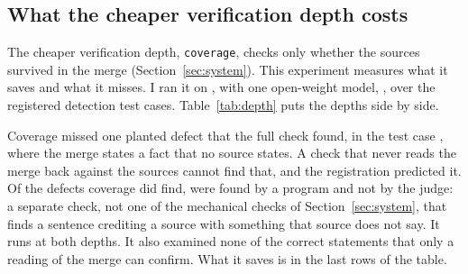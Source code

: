 \subsection{What the cheaper verification depth costs}
\label{sec:depth}

The cheaper verification depth, \texttt{coverage}, checks only whether the sources survived in the merge (Section~\ref{sec:system}). This experiment measures what it saves and what it misses. I ran it on , with one open-weight model, , over the  registered detection test cases. Table~\ref{tab:depth} puts the depths side by side.

Coverage missed one planted defect that the full check found, in the test case \texttt{}, where the merge states a fact that no source states. A check that never reads the merge back against the sources cannot find that, and the registration predicted it. Of the defects coverage did find,  were found by a program and not by the judge: a separate check, not one of the  mechanical checks of Section~\ref{sec:system}, that finds a sentence crediting a source with something that source does not say. It runs at both depths. It also examined none of the  correct statements that only a reading of the merge can confirm. What it saves is in the last rows of the table.

